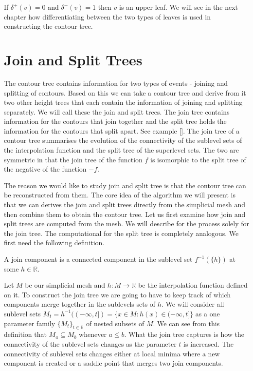If $\delta^+(v) = 0$ and $\delta^-(v) = 1$ then $v$ is an upper leaf. We will see in the next chapter how differentiating between the two types of leaves is used in constructing the contour tree.

\section{Join and Split Trees}

The contour tree contains information for two types of events - joining and splitting of contours. Based on this we can take a contour tree and derive from it two other height trees that each contain the information of joining and splitting separately. We will call these the join and split trees. The join tree contains information for the contours that join together and the split tree holds the information for the contours that split apart. See example []. The join tree of a contour tree summarises the evolution of the connectivity of the sublevel sets of the interpolation function and the split tree of the superlevel sets. The two are symmetric in that the join tree of the function $f$ is isomorphic to the split tree of the negative of the function $-f$.

The reason we would like to study join and split tree is that the contour tree can be reconstructed from them. The core idea of the algorithm we will present is that we can derives the join and split trees directly from the simplicial mesh and then combine them to obtain the contour tree. Let us first examine how join and split trees are computed from the mesh. We will describe for the process solely for the join tree. The computational for the split tree is completely analogous.  We first need the following definition.

\begin{defn} A join component is a connected component in the sublevel set $f^{-1}(\{h\})$ at some $h \in \mathbb{R}$.  \end{defn}

Let $M$ be our simplicial mesh and $h : M \to \mathbb{R}$ be the interpolation function defined on it. To construct the join tree we are going to have to keep track of which components merge together in the sublevels sets of $h$. We will consider all sublevel sets $M_t = h^{-1}((-\infty, t]) = \{x \in M : h(x) \in (-\infty, t] \}$ as a one parameter family $\{M_t\}_{t \in \mathbb{R}}$ of nested subsets of $M$. We can see from this definition that $M_a \subseteq M_b$ whenever $a \le b$. What the join tree captures is how the connectivity of the sublevel sets changes as the parameter $t$ is increased. The connectivity of sublevel sets changes either at local minima where a new component is created or a saddle point that merges two join components.

